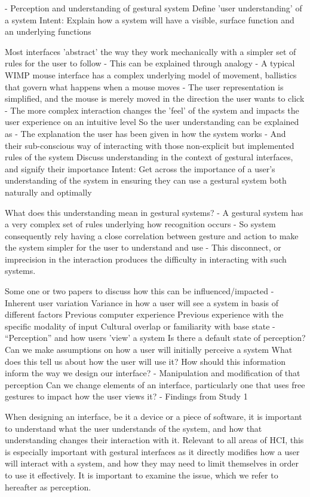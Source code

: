 \begin{todoenv}
- Perception and understanding of gestural system
Define 'user understanding' of a system
Intent: Explain how a system will have a visible, surface function and an underlying functions

Most interfaces 'abstract' the way they work mechanically with a simpler set of rules for the user to follow
- This can be explained through analogy
- A typical WIMP mouse interface has a complex underlying model of movement, ballistics that govern what happens when a mouse moves
- The user representation is simplified, and the mouse is merely moved in the direction the user wants to click
- The more complex interaction changes the 'feel' of the system and impacts the user experience on an intuitive level
So the user understanding can be explained as
- The explanation the user has been given in how the system works
- And their sub-conscious way of interacting with those non-explicit but implemented rules of the system
		Discuss understanding in the context of gestural interfaces, and signify their importance
Intent: Get across the importance of a user's understanding of the system in ensuring they can use a gestural system both naturally and optimally

What does this understanding mean in gestural systems?
- A gestural system has a very complex set of rules underlying how recognition occurs
- So system consequently rely having a close correlation between gesture and action to make the system simpler for the user to understand and use
- This disconnect, or imprecision in the interaction produces the difficulty in interacting with such systems.

Some one or two papers to discuss how this can be influenced/impacted
- Inherent user variation
Variance in how a user will see a system in basis of different factors
Previous computer experience
Previous experience with the specific modality of input
Cultural overlap or familiarity with base state
- “Perception” and how users 'view' a system
Is there a default state of perception?
Can we make assumptions on how a user will initially perceive a system
What does this tell us about how the user will use it?
How should this information inform the way we design our interface?
- Manipulation and modification of that perception
Can we change elements of an interface, particularly one that uses free gestures to impact how the user views it?
- Findings from Study 1
\end{todoenv}

When designing an interface, be it a device or a piece of software, it is important to understand what the user understands of the system, and how that understanding changes their interaction with it. Relevant to all areas of HCI, this is especially important with gestural interfaces as it directly modifies how a user will interact with a system, and how they may need to limit themselves in order to use it effectively. It is important to examine the issue, which we refer to hereafter as perception.

